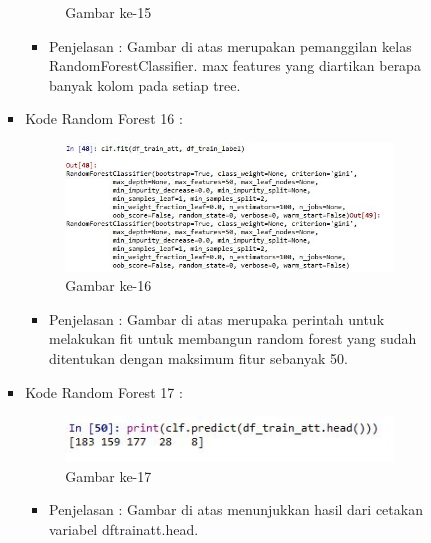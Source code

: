 \begin{enumerate}
\begin{itemize}
\begin{itemize}
\begin{itemize}
\begin{figure}[ht]
\caption{Gambar ke-15}
\label{contoh}
\end{figure}
\par
\begin{itemize} 
\item Penjelasan : Gambar di atas merupakan pemanggilan kelas RandomForestClassifier. max features yang diartikan berapa banyak kolom pada setiap tree.
\par
\par
\end{itemize}
\item Kode Random Forest 16 :
\par
\begin{figure}[ht]
\centering
\includegraphics[scale=0.7]{figures/hmm/cod16.jpg}
\caption{Gambar ke-16}
\label{contoh}
\end{figure}
\par
\begin{itemize}
\item Penjelasan : Gambar di atas merupaka perintah untuk melakukan fit untuk membangun random forest yang sudah ditentukan dengan maksimum fitur sebanyak 50.
\par
\par
\end{itemize}
\item Kode Random Forest 17 :
\par
\begin{figure}[ht]
\centering
\includegraphics[scale=0.7]{figures/hmm/cod17.jpg}
\caption{Gambar ke-17}
\label{contoh}
\end{figure}
\par
\begin{itemize}
\item Penjelasan : Gambar di atas menunjukkan hasil dari cetakan variabel dftrainatt.head.
\par

\end{itemize}
\end{itemize}
\end{itemize}
\end{itemize}
\end{enumerate}

